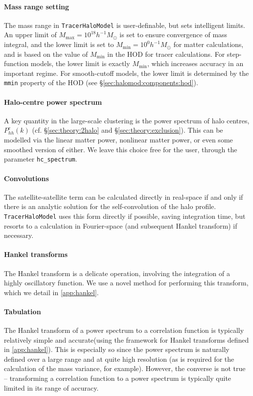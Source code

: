 \documentclass[5p,aas_macros]{elsarticle}
\begin{document}
\paragraph*{Mass range setting}
The mass range in \verb|TracerHaloModel| is user-definable, but sets intelligent limits. An upper limit of $M_\text{max} = 10^{18}h^{-1}M_\odot$ is set to ensure convergence of mass integral, and the lower limit is set to $M_\text{min} = 10^{0}h^{-1}M_\odot$ for matter calculations, and is based on the value of $M_\text{min}$ in the HOD for tracer calculations. For step-function models, the lower limit is exactly $M_\text{min}$, which increases accuracy in an important regime. For smooth-cutoff models, the lower limit is determined by the \verb|mmin| property of the HOD (see \S\ref{sec:halomod:components:hod}).

\paragraph*{Halo-centre power spectrum}
A key quantity in the large-scale clustering is the power spectrum of halo centres, $P_{hh}^c(k)$ (cf. \S\ref{sec:theory:2halo} and \S\ref{sec:theory:exclusion}). This can be modelled via the linear matter power, nonlinear matter power, or even some smoothed version of either. We leave this choice free for the user, through the parameter \verb|hc_spectrum|. 

\paragraph*{Convolutions}
The satellite-satellite term can be calculated directly in real-space if and only if there is an analytic solution for the self-convolution of the halo profile. \verb|TracerHaloModel| uses this form directly if possible, saving integration time, but resorts to a calculation in Fourier-space (and subsequent Hankel transform) if necessary. 

\paragraph*{Hankel transforms} 
The Hankel transform is a delicate operation, involving the integration of a highly oscillatory function. We use a novel method for performing this transform, which we detail in \ref{app:hankel}.

\paragraph*{Tabulation}
The Hankel transform of a power spectrum to a correlation function is typically relatively simple and accurate(using the framework for Hankel transforms defined in \ref{app:hankel}).
This is especially so since the power spectrum is naturally defined over a large range and at quite high resolution (as is required for the calculation of the mass variance, for example). 
However, the converse is not true -- transforming a correlation function to a power spectrum is typically quite limited in its range of accuracy. 
\end{document}
